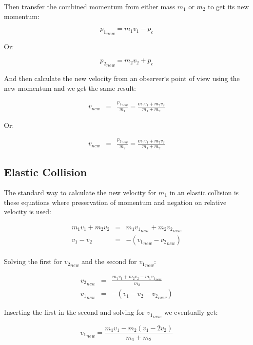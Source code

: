 Then transfer the combined momentum from either mass $m_1$ or $m_2$ to get its new momentum:

\begin{equation}
{p_1}_{new} = m_1 v_1 - p_c
\end{equation}

Or:

\begin{equation}
{p_2}_{new} = m_2 v_2 + p_c
\end{equation}

And then calculate the new velocity from an observer`s point of view using the new momentum and we get the same result:

\begin{eqnarray}
{v}_{new} &=& \frac{{p_1}_{new}}{m_1} = \frac{m_1 v_1 + m_2 v_2}{m_1 + m_2}
\end{eqnarray}

Or:

\begin{eqnarray}
{v}_{new} &=& \frac{{p_2}_{new}}{m_2} = \frac{m_1 v_1 + m_2 v_2}{m_1 + m_2}
\end{eqnarray}

\subsection{Elastic Collision}

The standard way to calculate the new velocity for $m_1$ in an elastic collision is these equations where preservation of momentum and negation on relative velocity is used:

\begin{eqnarray}
m_1 v_1 + m_2 v_2 &=& m_1 {v_1}_{new} + m_2 {v_2}_{new} \\
v_1 - v_2 &=& -({v_1}_{new} - {v_2}_{new}) \\
\end{eqnarray}

Solving the first for ${v_2}_{new}$ and the second for ${v_1}_{new}$:

\begin{eqnarray}
{v_2}_{new} &=& \frac{m_1 v_1 + m_2 v_2 - m_1 {v_1}_{new}}{m_2} \\
{v_1}_{new} &=& -(v_1 - v_2 - {v_2}_{new})
\end{eqnarray}

Inserting the first in the second and solving for ${v_1}_{new}$ we eventually get:

\begin{equation}
{v_1}_{new} = \frac{m_1 v_1 - m_2(v_1-2 v_2)}{m_1 + m_2}
\end{equation}

